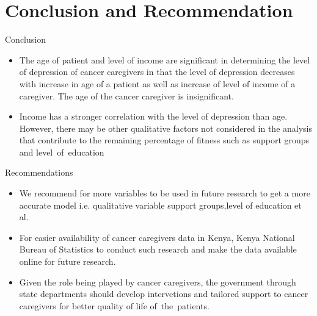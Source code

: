\documentclass{beamer}
\numberwithin{equation}{section}
\numberwithin{table}{section}
\begin{document}
\section{Conclusion and Recommendation}
\begin{frame}{Conclusion}
	\begin{itemize}
		\item The age of patient and level of income are significant in determining the level of depression of cancer caregivers in that the level of depression decreases with increase in age of a patient as well as increase of level of income of a caregiver. The age of the cancer caregiver is insignificant.
		\item Income has a stronger correlation with the  level of depression than age. However, there may be other qualitative factors not considered in the analysis that contribute to the remaining percentage of fitness such as support groups and level of education
	\end{itemize}
\end{frame}
\begin{frame}{Recommendations}
	\begin{itemize}
		\item We recommend for more variables to be used in future research to get a more accurate model i.e. qualitative variable support groups,level of education et al.
		\item For easier availability of cancer caregivers data in Kenya, Kenya National Bureau  of Statistics to conduct such research and make the data available online for future research.
		\item Given the role being played by cancer caregivers, the government through state departments should develop intervetions and tailored support to cancer caregivers for better quality of life of the patients.
	\end{itemize}
\end{frame}
\end{document}
